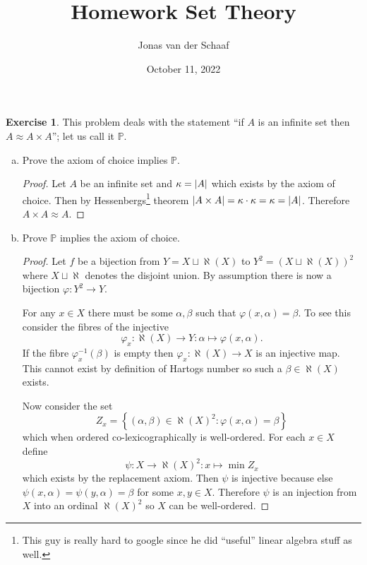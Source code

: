\documentclass{article}
\title{Homework Set Theory}
\date{October 11, 2022}
\author{Jonas van der Schaaf}
\theoremstyle{definition}
\newtheorem{question}{Exercise}
\newcommand{\set}[1]{\left\{#1\right\}}
\newcommand{\setwith}[2]{\set{#1\colon#2}}
\DeclarePairedDelimiter{\abs}{|}{|}
\begin{document}
\maketitle

\begin{question}
    This problem deals with the statement ``if \(A\) is an infinite set then
    \(A\approx A\times A\)''; let us call it \(\mathbb{P}\).
    \begin{enumerate}[a.]
        \item Prove the axiom of choice implies \(\mathbb{P}\).

              \begin{proof}
                  Let \(A\) be an infinite set and \(\kappa=\abs{A}\) which
                  exists by the axiom of choice. Then by
                  Hessenbergs\footnote{This guy is really hard to google since
                      he did ``useful'' linear algebra stuff as well.} theorem
                  \(\abs{A\times A}=\kappa\cdot\kappa=\kappa=\abs{A}\).
                  Therefore \(A\times A\approx A\).
              \end{proof}

        \item Prove \(\mathbb{P}\) implies the axiom of choice.

              \begin{proof}
                  Let \(f\) be a bijection from \(Y=X\sqcup\aleph(X)\) to
                  \(Y^{2}=(X\sqcup\aleph(X))^{2}\) where \(X\sqcup\aleph\)
                  denotes the disjoint union. By assumption there is now a
                  bijection \(\varphi:Y^{2}\to Y\).

                  For any \(x\in X\) there must be some \(\alpha,\beta\) such
                  that \(\varphi(x,\alpha)=\beta\). To see this consider the
                  fibres of the injective
                  \[
                      \varphi_{x}:\aleph(X)\to Y:\alpha\mapsto\varphi(x,\alpha).
                  \]
                  If the fibre \(\varphi_{x}^{-1}(\beta)\) is empty then
                  \(\varphi_{x}:\aleph(X)\to X\) is an injective map. This
                  cannot exist by definition of Hartogs number so such a
                  \(\beta\in\aleph(X)\) exists.

                  Now consider the set
                  \[
                      Z_{x}=\setwith{(\alpha,\beta)\in\aleph(X)^{2}}{\varphi(x,\alpha)=\beta}
                  \]
                  which when ordered co-lexicographically is well-ordered. For
                  each \(x\in X\) define
                  \[
                      \psi:X\to\aleph(X)^{2}:x\mapsto\min Z_{x}
                  \]
                  which exists by the replacement axiom. Then \(\psi\) is
                  injective because else \(\psi(x,\alpha)=\psi(y,\alpha)=\beta\)
                  for some \(x,y\in X\). Therefore \(\psi\) is an injection
                  from \(X\) into an ordinal \(\aleph(X)^{2}\) so \(X\) can be
                  well-ordered.


\end{proof}
\end{enumerate}
\end{question}
\end{document}
